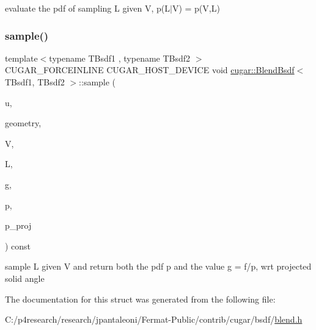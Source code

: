 evaluate the pdf of sampling L given V, p(L$\vert$V) = p(\+V,\+L) \mbox{\label{structcugar_1_1_blend_bsdf_ad2aff372bc3fa24b90e99505d7cb7c37}} 
\subsubsection{\texorpdfstring{sample()}{sample()}}
{\footnotesize\ttfamily template$<$typename T\+Bsdf1 , typename T\+Bsdf2 $>$ \\
C\+U\+G\+A\+R\+\_\+\+F\+O\+R\+C\+E\+I\+N\+L\+I\+NE C\+U\+G\+A\+R\+\_\+\+H\+O\+S\+T\+\_\+\+D\+E\+V\+I\+CE void \hyperlink{structcugar_1_1_blend_bsdf}{cugar\+::\+Blend\+Bsdf}$<$ T\+Bsdf1, T\+Bsdf2 $>$\+::sample (\begin{DoxyParamCaption}\item[{const \hyperlink{structcugar_1_1_vector}{Vector3f}}]{u,  }\item[{const \hyperlink{structcugar_1_1_differential_geometry}{Differential\+Geometry} \&}]{geometry,  }\item[{const \hyperlink{structcugar_1_1_vector}{Vector3f}}]{V,  }\item[{\hyperlink{structcugar_1_1_vector}{Vector3f} \&}]{L,  }\item[{\hyperlink{structcugar_1_1_vector}{Vector3f} \&}]{g,  }\item[{float \&}]{p,  }\item[{float \&}]{p\+\_\+proj }\end{DoxyParamCaption}) const\hspace{0.3cm}{\ttfamily [inline]}}

sample L given V and return both the pdf p and the value g = f/p, wrt projected solid angle 

The documentation for this struct was generated from the following file\+:\begin{DoxyCompactItemize}
\item 
C\+:/p4research/research/jpantaleoni/\+Fermat-\/\+Public/contrib/cugar/bsdf/\hyperlink{blend_8h}{blend.\+h}\end{DoxyCompactItemize}
